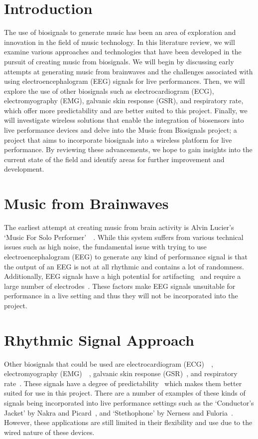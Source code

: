

\section{Introduction}
The use of biosignals to generate music has been an area of exploration and innovation in the field of music technology.
In this literature review, we will examine various approaches and technologies that have been developed in the pursuit of creating music from biosignals.
We will begin by discussing early attempts at generating music from brainwaves
and the challenges associated with using electroencephalogram (EEG) signals for live performances.
Then, we will explore the use of other biosignals such as electrocardiogram (ECG), electromyography (EMG), galvanic skin response (GSR), and respiratory rate,
which offer more predictability and are better suited to this project.
Finally, we will investigate wireless solutions that enable the integration of biosensors into live performance devices and
delve into the Music from Biosignals project; a project that aims to incorporate biosignals into a wireless platform for live performance.
By reviewing these advancements, we hope to gain insights into the current state of the field and identify areas for further improvement and development.

\section{Music from Brainwaves}
The earliest attempt at creating music from brain activity is Alvin Lucier's `Music For Solo Performer'~\cite{Lucier:2010}~\cite{Straebel:2014}.
While this system suffers from various technical issues such as high noise,
the fundamental issue with trying to use electroencephalogram (EEG) to generate any kind of performance signal
is that the output of an EEG is not at all rhythmic and contains a lot of randomness.
Additionally, EEG signals have a high potential for artifacting~\cite{Mannan:2018} and require a large number of electrodes~\cite{Piorecky:2019}.
These factors make EEG signals unsuitable for performance in a live setting and thus they will not be incorporated into the project.

\section{Rhythmic Signal Approach}
Other biosignals that could be used are electrocardiogram (ECG)~\cite{Afonso:1999}~\cite{Pan:1985},
electromyography (EMG)~\cite{Tanaka:2002}~\cite{Young:2013}, galvanic skin response (GSR)~\cite{Kurniawan:2013}, and respiratory rate~\cite{Carlos:2011}.
These signals have a degree of predictability~\cite{Tahiroğlu:2008} which makes them better suited for use in this project.
There are a number of examples of these kinds of signals being incorporated into live performance settings such as
the `Conductor's Jacket' by Nakra and Picard~\cite{Nakra:1998}, and `Stethophone' by Nerness and Fuloria~\cite{Nerness:2019}.
However, these applications are still limited in their flexibility and use due to the wired nature of these devices.

